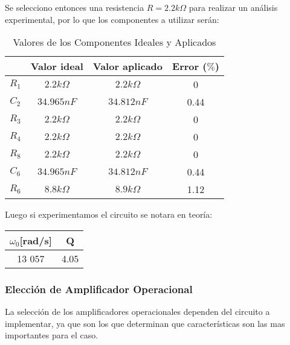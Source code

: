 Se selecciono entonces una resistencia $R = 2.2k\Omega$ para realizar un análisis experimental, por lo que los componentes a utilizar serán:
\begin{table}[H]
	\centering
	\begin{tabular}{|c|c|c|c|}
		\hline
		           		& Valor ideal                              & Valor aplicado                      	& Error ($\%$) 	\\ \hline \hline
		$R_1$      		& $2.2k\Omega$                        & $2.2k\Omega$                       	& 0            	\\ \hline
		$C_2$      		& $34.965nF$				& $34.812nF$               		& 0.44         	\\ \hline
		$R_3$      		& $2.2k\Omega$                        & $2.2k\Omega$                       & 0            	\\ \hline
		$R_4$      		& $2.2k\Omega$                        & $2.2k\Omega$                       & 0            	\\ \hline
		$R_8$      		& $2.2k\Omega$                        & $2.2k\Omega$                       & 0            	\\ \hline
		$C_6$      		& $34.965nF$ 				& $34.812nF$               		& 0.44         	\\ \hline
		$R_6$      		& $8.8k\Omega$                      	& $8.9k\Omega$       			& 1.12            	\\ \hline
	\end{tabular}
	\caption{Valores de los Componentes Ideales y Aplicados}
\end{table}
Luego si experimentamos el circuito se notara en teoría:
\begin{table}[h]
\centering
\begin{tabular}{cc}
\hline
$\omega_0${[}rad/s{]} & Q    \\ \hline
13 057        & 4.05 \\ \hline
\end{tabular}
\end{table}

\subsubsection{Elección de Amplificador Operacional}

La selección de los amplificadores operacionales dependen del circuito a implementar, ya que son los que determinan que características son las mas importantes para el caso.

